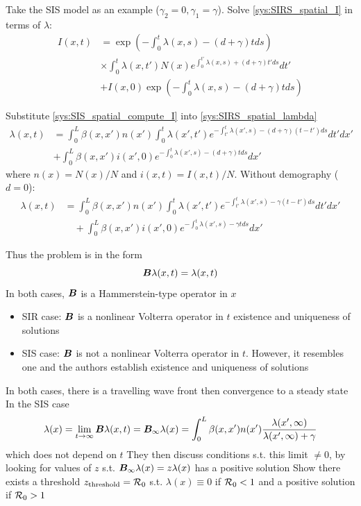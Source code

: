 \documentclass[aspectratio=169]{beamer}\usepackage[]{graphicx}\usepackage[]{xcolor}
\begin{document}
\begin{frame}
Take the SIS model as an example ($\gamma_2=0,\gamma_1=\gamma$). Solve \eqref{sys:SIRS_spatial_I} in terms of $\lambda$:
\begin{equation}\label{sys:SIS_spatial_compute_I}
\begin{aligned}
I(x,t) &= \exp\left(-\int_0^t\lambda(x,s)-(d+\gamma)tds\right) \\
& \times \int_0^t \lambda(x,t')N(x)
e^{\int_0^{t'}\lambda(x,s)+(d+\gamma)t' ds}dt' \\
&+I(x,0)\exp\left(-\int_0^t \lambda(x,s)-(d+\gamma)tds\right)
\end{aligned}
\end{equation}
\end{frame}

\begin{frame}
Substitute \eqref{sys:SIS_spatial_compute_I} into \eqref{sys:SIRS_spatial_lambda}
\[
\begin{aligned}
\lambda(x,t) &=
\int_0^L \beta(x,x')n(x')
\int_0^t \lambda(x',t')
e^{-\int_{t'}^t \lambda(x',s)-(d+\gamma)(t-t')ds}dt'dx' \\
&+\int_0^L \beta(x,x')i(x',0)
e^{-\int_0^t \lambda(x',s)-(d+\gamma)t ds}dx'
\end{aligned}
\]
where $n(x)=N(x)/N$ and $i(x,t)=I(x,t)/N$. Without demography ($d=0$):
\[
\begin{aligned}
\lambda(x,t) &=
\int_0^L \beta(x,x')n(x')
\int_0^t \lambda(x',t')
e^{-\int_{t'}^t \lambda(x',s)-\gamma(t-t')ds}dt'dx' \\
&\quad +\int_0^L \beta(x,x')i(x',0)
e^{-\int_0^t \lambda(x',s)-\gamma t ds}dx'
\end{aligned}
\]
\end{frame}


\begin{frame}
Thus the problem is in the form
\[
\bm{B}\lambda(x,t)=\lambda(x,t)
\]
\vfill
In both cases, $\bm{B}$ is a Hammerstein-type operator in $x$
\vfill
\begin{itemize}
\item SIR case: $\bm{B}$ is a nonlinear Volterra operator in $t$ \imply existence and uniqueness of solutions
\vfill
\item SIS case: $\bm{B}$ is not a nonlinear Volterra operator in $t$. However, it resembles one and the authors establish existence and uniqueness of solutions
\end{itemize}
\end{frame}


\begin{frame}
In both cases, there is a travelling wave front then convergence to a steady state
\vfill
In the SIS case
\[
\lambda(x)=\lim_{t\to\infty}\bm{B}\lambda(x,t)
=\bm{B}_\infty\lambda(x)=
\int_0^L\beta(x,x')n(x')
\frac{\lambda(x',\infty)}{\lambda(x',\infty)+\gamma}
\]
which does not depend on $t$
\vfill 
They then discuss conditions s.t. this limit $\neq 0$, by looking for values of $z$ s.t. $\bm{B}_\infty\lambda(x)=z\lambda(x)$ has a positive solution
\vfill
Show there exists a threshold $z_{\text{threshold}}=\mathcal{R}_0$ s.t. $\lambda(x)\equiv 0$ if $\mathcal{R}_0<1$ and a positive solution if $\mathcal{R}_0>1$
\end{frame}
\end{document}
